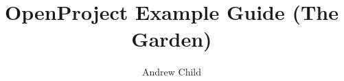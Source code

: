 \documentclass[10pt]{report}
\begin{document}
\title{OpenProject Example Guide (The Garden)}
\author{Andrew Child}
\date{}
\maketitle

\newcommand\chapterColor{MidnightBlue}

\twocolumn
\renewcommand\chapterColor{BrickRed}

\end{document}
